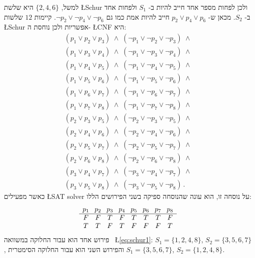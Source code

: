 למשל,
$\{2,4,6\}$
היא שלשת
\L{Schur}
ולכן לפחות מספר אחד חייב להיות ב-%
$S_1$
ולפחות אחד ב-%
$S_2$.
מכאן ש-%
$p_2 \vee p_4 \vee p_6$
חייב להיות אמת כמו גם 
$\neg p_2 \vee \neg p_4 \vee \neg p_6$.
קיימות 
$12$
שלשות 
\L{Schur}
אפשריות ולכן נוחסת ה-%
\L{CNF}
היא:
\begin{equation}
\begin{array}{l}
(p_1 \vee p_2 \vee p_3) \;\wedge\; (\neg p_1 \vee \neg p_2 \vee \neg p_3) \;\wedge \\
(p_1 \vee p_3 \vee p_4) \;\wedge\; (\neg p_1 \vee \neg p_3 \vee \neg p_4) \;\wedge \\
(p_1 \vee p_4 \vee p_5) \;\wedge\; (\neg p_1 \vee \neg p_4 \vee \neg p_5) \;\wedge \\
(p_1 \vee p_5 \vee p_6) \;\wedge\; (\neg p_1 \vee \neg p_5 \vee \neg p_6) \;\wedge \\
(p_1 \vee p_6 \vee p_7) \;\wedge\; (\neg p_1 \vee \neg p_6 \vee \neg p_7) \;\wedge \\
(p_1 \vee p_7 \vee p_8) \;\wedge\; (\neg p_1 \vee \neg p_7 \vee \neg p_8) \;\wedge \\
(p_2 \vee p_3 \vee p_5) \;\wedge\; (\neg p_2 \vee \neg p_3 \vee \neg p_5) \;\wedge \\
(p_2 \vee p_4 \vee p_6) \;\wedge\; (\neg p_2 \vee \neg p_4 \vee \neg p_6) \;\wedge \\
(p_2 \vee p_5 \vee p_7) \;\wedge\; (\neg p_2 \vee \neg p_5 \vee \neg p_7) \;\wedge \\
(p_2 \vee p_6 \vee p_8) \;\wedge\; (\neg p_2 \vee \neg p_6 \vee \neg p_8) \;\wedge \\
(p_3 \vee p_4 \vee p_7) \;\wedge\; (\neg p_3 \vee \neg p_4 \vee \neg p_7) \;\wedge \\
(p_3 \vee p_5 \vee p_8) \;\wedge\; (\neg p_3 \vee \neg p_5 \vee \neg p_8)\,.
\end{array}\label{eq.schur2}
\end{equation}
כאשר מפעילים 
\L{SAT solver}
על נוסחה זו, הוא עונה שהנוסחה ספיקה בשני הפירושים הללו:
\[
\begin{array}{c@{\hspace{8pt}}c@{\hspace{8pt}}c@{\hspace{8pt}}c@{\hspace{8pt}}c@{\hspace{8pt}}c@{\hspace{8pt}}c@{\hspace{8pt}}c}
p_1&p_2&p_3&p_4&p_5&p_6&p_7&p_8\\\hline
F&F&T&F&T&T&T&F\\
T&T&F&T&F&F&F&T
\end{array}
\]
פירוש אחד הוא עבור החלוקה במשוואה%
~\L{\ref{eq:schur1}}:
$S_1=\{1,2,4,8\}$, $S_2=\{3,5,6,7\}$, 
והפירוש השני הוא עבור החלוקה הסימטרית
 $S_1=\{3,5,6,7\}$, $S_2=\{1,2,4,8\}$.

